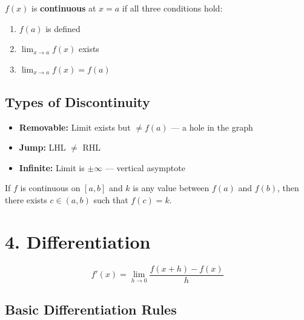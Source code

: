 \documentclass[12pt]{article}
\begin{document}
\begin{defbox}
$f(x)$ is \textbf{continuous} at $x = a$ if all three conditions hold:
\begin{enumerate}[leftmargin=20pt, itemsep=2pt]
  \item $f(a)$ is defined
  \item $\displaystyle\lim_{x \to a} f(x)$ exists
  \item $\displaystyle\lim_{x \to a} f(x) = f(a)$
\end{enumerate}
\end{defbox}

\subsection{Types of Discontinuity}

\begin{itemize}[leftmargin=16pt, itemsep=4pt]
  \item \textbf{Removable:} Limit exists but $\neq f(a)$ — a hole in the graph
  \item \textbf{Jump:} LHL $\neq$ RHL
  \item \textbf{Infinite:} Limit is $\pm\infty$ — vertical asymptote
\end{itemize}

\begin{thmbox}
If $f$ is continuous on $[a,b]$ and $k$ is any value between $f(a)$ and $f(b)$, then there exists $c \in (a,b)$ such that $f(c) = k$.
\end{thmbox}

\section{4. Differentiation}

\begin{defbox}
\[
  f'(x) = \lim_{h \to 0} \frac{f(x+h) - f(x)}{h}
\]
\end{defbox}

\subsection{Basic Differentiation Rules}
\end{document}
